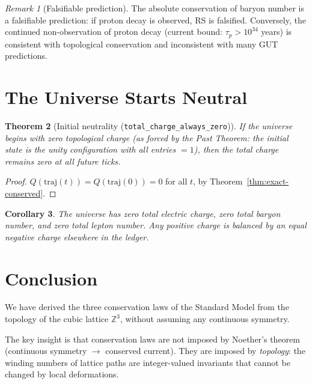 \documentclass[11pt,a4paper]{article}
\theoremstyle{plain}
\newtheorem{theorem}{Theorem}[section]
\newtheorem{corollary}[theorem]{Corollary}
\theoremstyle{definition}
\theoremstyle{remark}
\newtheorem{remark}[theorem]{Remark}
\newcommand{\Z}{\mathbb{Z}}
\begin{document}
\begin{remark}[Falsifiable prediction]
The absolute conservation of baryon number is a falsifiable prediction:
if proton decay is observed, RS is falsified.  Conversely, the
continued non-observation of proton decay (current bound:
$\tau_p > 10^{34}$ years) is consistent with topological conservation
and inconsistent with many GUT predictions.
\end{remark}

\section{The Universe Starts Neutral}
\label{sec:neutral}

\begin{theorem}[Initial neutrality {\normalfont(\texttt{total\_charge\_always\_zero})}]
If the universe begins with zero topological charge (as forced by the
Past Theorem: the initial state is the unity configuration with all
entries $= 1$), then the total charge remains zero at all future ticks.
\end{theorem}

\begin{proof}
$Q(\text{traj}(t)) = Q(\text{traj}(0)) = 0$ for all $t$, by
Theorem~\ref{thm:exact-conserved}.
\end{proof}

\begin{corollary}
The universe has zero total electric charge, zero total baryon number,
and zero total lepton number.  Any positive charge is balanced by an
equal negative charge elsewhere in the ledger.
\end{corollary}

\section{Conclusion}
\label{sec:conclusion}

We have derived the three conservation laws of the Standard Model from
the topology of the cubic lattice $\Z^3$, without assuming any
continuous symmetry.

The key insight is that conservation laws are not imposed by Noether's
theorem (continuous symmetry $\to$ conserved current).  They are imposed
by \emph{topology}: the winding numbers of lattice paths are integer-valued
invariants that cannot be changed by local deformations.
\end{document}
